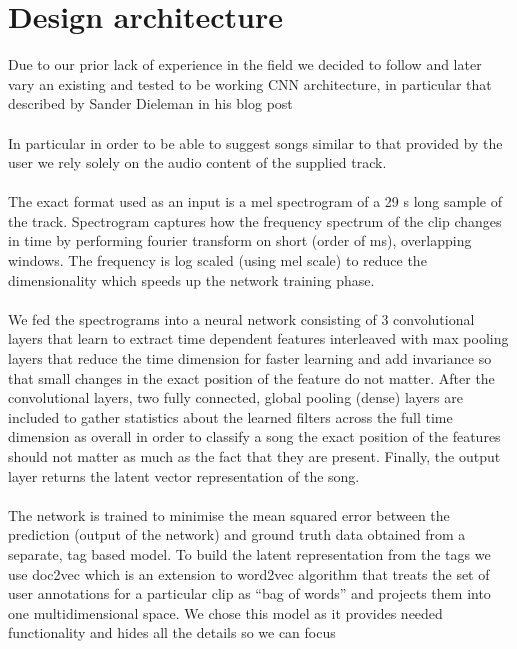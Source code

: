 \documentclass[11pt, a4paper]{article}
\begin{document}
  \section{Design architecture}
    Due to our prior lack of experience in the field we decided to follow
    and later vary an existing and tested to be working CNN architecture, in
    particular that described by Sander Dieleman in his blog post
    \cite{spotify-dieleman}
    \\ \\
    \noindent    
    In particular in order to be able to suggest songs similar to that provided
    by the user we rely solely on the audio content of the supplied track.
    \\ \\
    \noindent
    The exact format used as an input is a mel spectrogram of a 29 s long sample
    of the track. Spectrogram captures how the frequency spectrum of the clip
    changes in time by performing fourier transform on short (order of ms),
    overlapping windows. The frequency is log scaled (using mel scale) to reduce
    the dimensionality which speeds up the network training phase.
    \\ \\
    \noindent
    We fed the spectrograms into a neural network consisting of 3 convolutional
    layers that learn to extract time dependent features interleaved with
    max pooling layers that reduce the time dimension for faster learning and
    add invariance so that small changes in the exact position of the feature
    do not matter. After the convolutional layers, two fully connected, global
    pooling (dense) layers are included to gather statistics about the learned
    filters across the full time dimension as overall in order to classify a
    song the exact position of the features should not matter as much as the
    fact that they are present. Finally, the output layer returns the latent
    vector representation of the song.
    \\ \\
    \noindent
    The network is trained to minimise the mean squared error between the
    prediction (output of the network) and ground truth data obtained from
    a separate, tag based model. To build the latent representation from the
    tags we use doc2vec which is an extension to word2vec algorithm that treats
    the set of user annotations for a particular clip as ``bag of words'' and 
    projects them into one multidimensional space. We chose this model as it
    provides needed functionality and hides all the details so we can focus
\end{document}

